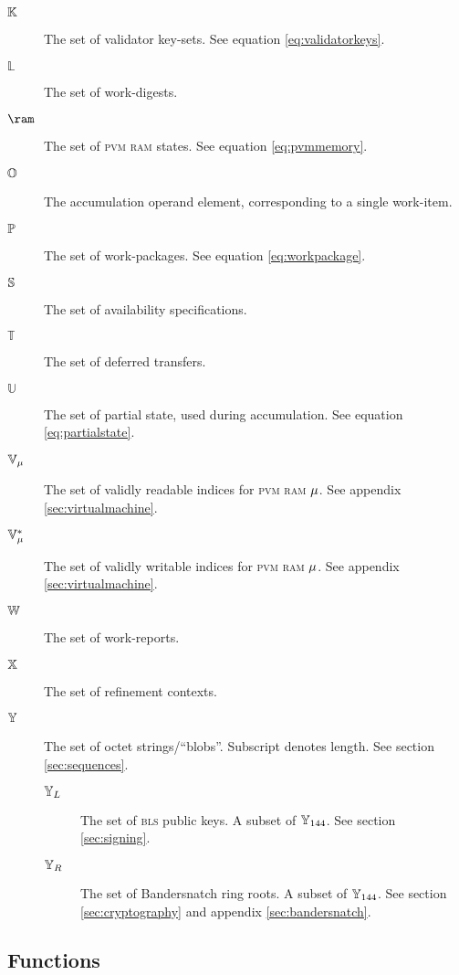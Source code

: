 \begin{description}
  \item[$\valkey$] The set of validator key-sets. See equation \ref{eq:validatorkeys}.
  \item[$\mathbb{L}$] The set of work-digests.
  \item[$\ram$] The set of \textsc{pvm} \textsc{ram} states. See equation \ref{eq:pvmmemory}.
  \item[$\operandtuple$] The accumulation operand element, corresponding to a single work-item.
  \item[$\workpackage$] The set of work-packages. See equation \ref{eq:workpackage}.
  \item[$\avspec$] The set of availability specifications.
  \item[$\mathbb{T}$] The set of deferred transfers.
  \item[$\mathbb{U}$] The set of partial state, used during accumulation. See equation \ref{eq:partialstate}.
  \item[$\readable{\memory}$] The set of validly readable indices for \textsc{pvm} \textsc{ram} $\memory$. See appendix \ref{sec:virtualmachine}.
  \item[$\writable{\memory}$] The set of validly writable indices for \textsc{pvm} \textsc{ram} $\memory$. See appendix \ref{sec:virtualmachine}.
  \item[$\workreport$] The set of work-reports.
  \item[$\workcontext$] The set of refinement contexts.
  \item[$\blob$] The set of octet strings/``blobs''. Subscript denotes length. See section \ref{sec:sequences}.
  \begin{description}
    \item[$\blskey$] The set of \textsc{bls} public keys. A subset of $\blob[144]$. See section \ref{sec:signing}.
    \item[$\ringroot$] The set of Bandersnatch ring roots. A subset of $\blob[144]$. See section \ref{sec:cryptography} and appendix \ref{sec:bandersnatch}.
  \end{description}
\end{description}

\subsection{Functions}

